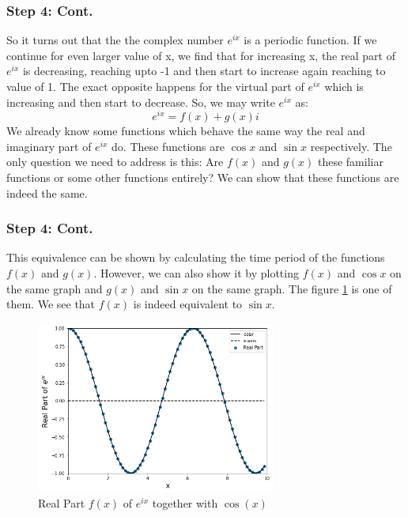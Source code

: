 \documentclass{beamer}
\begin{document}
\begin{frame}
    \frametitle{Step 4: Cont.}
    So it turns out that the the complex number $e^{ix}$ is a periodic function. If we continue for even larger value of x, we find that for increasing x, the real part of $e^{ix}$ is decreasing, reaching upto -1 and then start to increase again reaching to value of 1. The exact opposite happens for the virtual part of $e^{ix}$ which is increasing and then start to decrease.
    So, we may write $e^{ix}$ as:
    \begin{equation}
        \label{eq:9}
        e^{ix} = f(x) + g(x)i
    \end{equation}
    \pause
    We already know some functions which behave the same way the real and imaginary part of $e^{ix}$ do. These functions are $\cos{x}$ and $\sin{x}$ respectively. The only question we need to address is this: Are $f(x)$ and $g(x)$ these familiar functions or some other functions entirely? We can show that these functions are indeed the same.
\end{frame}

\begin{frame}
    \frametitle{Step 4: Cont.}
    This equivalence can be shown by calculating the time period of the functions $f(x)$ and $g(x)$. However, we can also show it by plotting $f(x)$ and $\cos{x}$ on the same graph and $g(x)$ and $\sin{x}$ on the same graph. The figure \ref{fig:real} is one of them.
    We see that $f(x)$ is indeed equivalent to $\sin{x}$.
    \begin{figure}
        \centering
        \includegraphics[width=0.7\textwidth, height=0.5\textheight]{img/real.png}
        \caption{\label{fig:real}Real Part $f(x)$ of $e^{ix}$ together with $\cos(x)$}
    \end{figure}
\end{frame}
\end{document}

